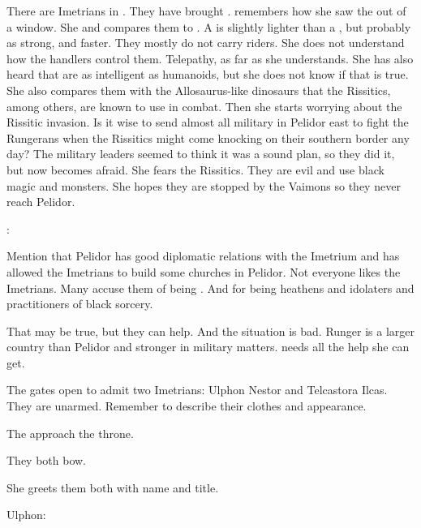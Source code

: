 
\begin{comment}
  \section{The Imetrians make an offer}
\end{comment}

There are Imetrians in \Malcur. 
They have brought \nycans. 
\Tiroco remembers how she saw the \nycans out of a window. 
She and compares them to \grulcans.
A \nycan is slightly lighter than a \grulcan, but probably as strong, and faster.
They mostly do not carry riders.
She does not understand how the handlers control them.
Telepathy, as far as she understands.
She has also heard that \nycans are as intelligent as humanoids, but she does not know if that is true.
She also compares them with the Allosaurus-like dinosaurs that the Rissitics, among others, are known to use in combat.
Then she starts worrying about the Rissitic invasion.
Is it wise to send almost all military in Pelidor east to fight the Rungerans when the Rissitics might come knocking on their southern border any day?
The military leaders seemed to think it was a sound plan, so they did it, but now \Tiroco becomes afraid. 
She fears the Rissitics.
They are evil and use black magic and monsters.
She hopes they are stopped by the Vaimons so they never reach Pelidor.


\Tiroco:

Mention that Pelidor has good diplomatic relations with the Imetrium and has allowed the Imetrians to build some churches in Pelidor. 
Not everyone likes the Imetrians. 
Many accuse them of being . 
And for being heathens and idolaters and practitioners of black sorcery. 

That may be true, but they can help. 
And the situation is bad. 
Runger is a larger country than Pelidor and stronger in military matters. 
\Tiroco needs all the help she can get. 

The gates open to admit two Imetrians: 
\Ispan Ulphon Nestor and \Retaxis Telcastora Ilcas. 
They are unarmed. 
Remember to describe their clothes and appearance. 

The approach the throne. 

They both bow.

She greets them both with name and title. 

Ulphon: 

